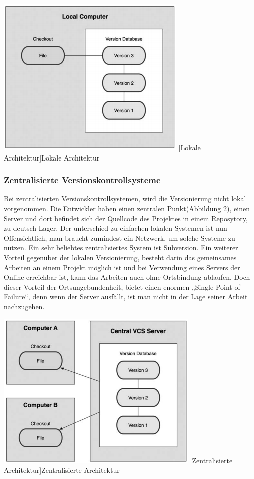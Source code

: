\documentclass[12pt,a4paper,bibliography=totocnumbered,listof=totocnumbered]{scrartcl}
\begin{document}
\vspace{3pt}
\begin{minipage}{\linewidth}
	\centering
	\includegraphics[width=0.4\linewidth]{Bilder/LVKS.png}
	[Lokale Architektur]{Lokale Architektur  \cite{chacon2009pro}\footnotemark }
	\label{Lokale Architektur}
\end{minipage}
\newpage
\subsubsection{Zentralisierte Versionskontrollsysteme}
Bei zentralisierten Versionskontrollsystemen, wird die Versionierung nicht lokal vorgenommen. Die Entwickler haben einen zentralen Punkt(Abbildung 2), einen Server und dort befindet sich der Quellcode des Projektes in einem Reposytory, zu deutsch Lager. Der unterschied zu einfachen lokalen Systemen ist nun Offensichtlich, man braucht zumindest ein Netzwerk, um solche Systeme zu nutzen. Ein sehr beliebtes zentralisiertes System ist Subversion. Ein weiterer Vorteil gegenüber der lokalen Versionierung, besteht darin das gemeinsames Arbeiten an einem Projekt möglich ist und bei Verwendung eines Servers der Online erreichbar ist, kann das Arbeiten auch ohne Ortsbindung ablaufen. Doch dieser Vorteil der Ortsungebundenheit, bietet einen enormen „Single Point of Failure“, denn wenn der Server ausfällt, ist man nicht in der Lage seiner Arbeit nachzugehen.

\vspace{3pt}
\begin{minipage}{\linewidth}
	\centering
	\includegraphics[width=0.3\linewidth]{Bilder/sub.png}
	[Zentralisierte Architektur]{Zentralisierte Architektur\footnotemark }
	\label{Zentralisierte Architektur}
\end{minipage} 	
\end{document}
